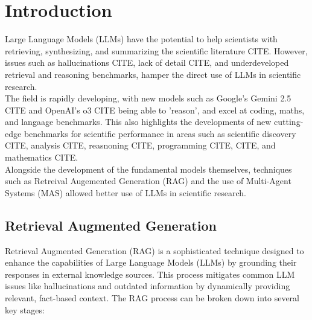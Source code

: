 \section{Introduction}
\label{sec:introduction}

Large Language Models (LLMs) have the potential to help scientists with retrieving, synthesizing, and summarizing the scientific literature CITE. 
However, issues such as hallucinations CITE, lack of detail CITE, and underdeveloped retrieval and reasoning benchmarks, hamper the direct use of LLMs in scientific research. \\

The field is rapidly developing, with new models such as Google's Gemini 2.5 CITE and OpenAI's o3 CITE being able to 'reason', and excel at coding, maths, and langaage benchmarks. 
This also highlights the developments of new cutting-edge benchmarks for scientific performance in areas such as scientific discovery CITE, analysis CITE, reasnoning CITE, programming CITE,
CITE, and mathematics CITE. \\

Alongside the development of the fundamental models themselves, techniques such as Retreival Augemented Generation (RAG) and the use of Multi-Agent Systems (MAS) allowed better use of LLMs in scientific research. \\

\subsection{Retrieval Augmented Generation}
Retrieval Augmented Generation (RAG) is a sophisticated technique designed to enhance the capabilities of Large Language Models (LLMs) by grounding their responses in external knowledge sources. This process mitigates common LLM issues like hallucinations and outdated information by dynamically providing relevant, fact-based context. The RAG process can be broken down into several key stages:

